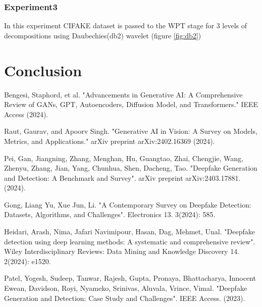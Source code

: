 \documentclass{svproc}
\begin{document}
\subsubsection{Experiment3}
In this experiment CIFAKE dataset is passed to the WPT stage for 3 levels of decompositions using Daubechies(db2) wavelet (figure \ref{fig:db2})

%
%

\section{Conclusion}




\begin{thebibliography}{6}

  Bengesi, Staphord, et al. "Advancements in Generative AI: A Comprehensive
  Review of GANs, GPT, Autoencoders, Diffusion Model, and Transformers." IEEE
  Access (2024).

  Raut, Gaurav, and Apoorv Singh. "Generative AI in Vision: A Survey on Models,
  Metrics, and Applications." arXiv preprint arXiv:2402.16369 (2024).

  Pei, Gan, Jiangning, Zhang, Menghan, Hu, Guangtao, Zhai, Chengjie, Wang,
  Zhenyu, Zhang, Jian, Yang, Chunhua, Shen, Dacheng, Tao. "Deepfake Generation
  and Detection: A Benchmark and Survey". arXiv preprint arXiv:2403.17881.
  (2024).

  Gong, Liang Yu, Xue Jun, Li. "A Contemporary Survey on Deepfake Detection:
  Datasets, Algorithms, and Challenges". Electronics 13. 3(2024): 585.

  Heidari, Arash, Nima, Jafari Navimipour, Hasan, Dag, Mehmet, Unal. "Deepfake
  detection using deep learning methods: A systematic and comprehensive
  review".
  Wiley Interdisciplinary Reviews: Data Mining and Knowledge Discovery 14.
  2(2024): e1520.

  Patel, Yogesh, Sudeep, Tanwar, Rajesh, Gupta, Pronaya, Bhattacharya, Innocent
  Ewean, Davidson, Royi, Nyameko, Srinivas, Aluvala, Vrince, Vimal. "Deepfake
  Generation and Detection: Case Study and Challenges". IEEE Access. (2023).



\end{thebibliography}
\end{document}
